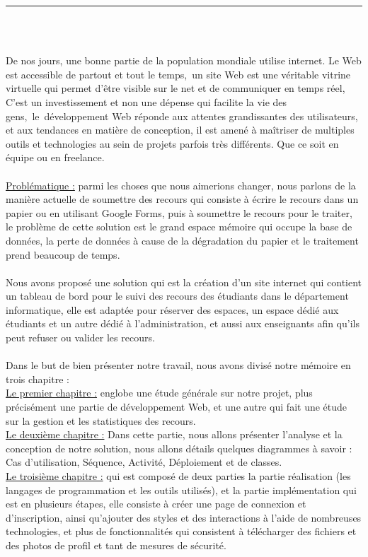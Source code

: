\documentclass[12pt]{report}
\begin{document}
\begin{center}
    {\color{Blue} \rule{6.2in}{1.4mm} }\\
    \vspace{0.1in}
    \scshape{\fontsize{34}{46}{\bfseries{\color{Blue}{Introduction générale}}}}
    \\
    \vspace{0.5in}
\end{center}
De nos jours, une bonne partie de la population mondiale utilise internet. Le Web est accessible de partout et tout le temps, un site Web est une véritable vitrine virtuelle qui permet d’être visible sur le net et de communiquer en temps réel, C’est un investissement et non une dépense qui facilite la vie des gens, le développement Web réponde aux attentes grandissantes des utilisateurs, et aux tendances en matière de conception, il est amené à maîtriser de multiples outils et technologies au sein de projets parfois très différents. Que ce soit en équipe ou en freelance.
\\\\
\uline{Problématique :} parmi les choses que nous aimerions changer, nous parlons de la manière actuelle de soumettre des recours qui consiste à écrire le recours dans un papier ou en utilisant Google Forms, puis à soumettre le recours pour le traiter, le problème de cette solution est le grand espace mémoire qui occupe la base de données, la perte de données à cause de la dégradation du papier et le traitement prend beaucoup de temps.
\\\\
Nous avons proposé une solution qui est la création d'un site internet qui contient un tableau de bord pour le suivi des recours des étudiants dans le département informatique, elle est adaptée pour réserver des espaces, un espace dédié aux étudiants et un autre dédié à l'administration, et aussi aux enseignants afin qu'ils peut refuser ou valider les recours.
\\\\
Dans le but de bien présenter notre travail, nous avons divisé notre mémoire en trois chapitre :
\\
\uline{Le premier chapitre :} englobe une étude générale sur notre projet, plus précisément une partie de développement Web, et une autre qui fait une étude sur la gestion et les statistiques des recours.
\\
\uline{Le deuxième chapitre :} 
Dans cette partie, nous allons présenter l'analyse et la conception de notre solution, nous allons détails quelques diagrammes à savoir : Cas d'utilisation, Séquence, Activité,  Déploiement et de classes.
\\
\uline{Le troisième chapitre :} qui est composé de deux parties la partie réalisation (les langages de programmation et les outils utilisés), et la partie implémentation qui est en plusieurs étapes, elle consiste à créer une page de connexion et d'inscription, ainsi qu'ajouter des styles et des interactions à l'aide de nombreuses technologies, et plus de fonctionnalités qui consistent à télécharger des fichiers et des photos de profil et tant de mesures de sécurité.
\end{document}
